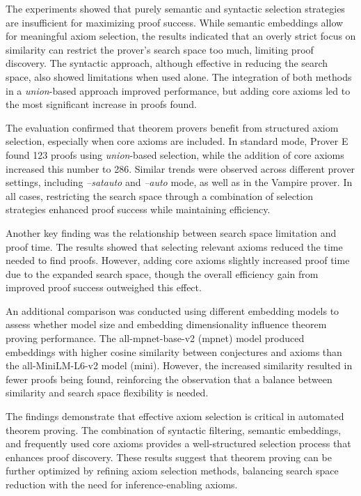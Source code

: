 \documentclass[english,version-2020-11]{uzl-thesis}
\begin{document}
The experiments showed that purely semantic and syntactic selection strategies are insufficient for maximizing proof success. While semantic embeddings allow for meaningful axiom selection, the results indicated that an overly strict focus on similarity can restrict the prover’s search space too much, limiting proof discovery. The syntactic approach, although effective in reducing the search space, also showed limitations when used alone. The integration of both methods in a \textit{union}-based approach improved performance, but adding core axioms led to the most significant increase in proofs found.

The evaluation confirmed that theorem provers benefit from structured axiom selection, especially when core axioms are included. In standard mode, Prover E found 123 proofs using \textit{union}-based selection, while the addition of core axioms increased this number to 286. Similar trends were observed across different prover settings, including \textit{--satauto} and \textit{--auto} mode, as well as in the Vampire prover. In all cases, restricting the search space through a combination of selection strategies enhanced proof success while maintaining efficiency.

Another key finding was the relationship between search space limitation and proof time. The results showed that selecting relevant axioms reduced the time needed to find proofs. However, adding core axioms slightly increased proof time due to the expanded search space, though the overall efficiency gain from improved proof success outweighed this effect.

An additional comparison was conducted using different embedding models to assess whether model size and embedding dimensionality influence theorem proving performance. The all-mpnet-base-v2 (mpnet) model produced embeddings with higher cosine similarity between conjectures and axioms than the all-MiniLM-L6-v2 model (mini). However, the increased similarity resulted in fewer proofs being found, reinforcing the observation that a balance between similarity and search space flexibility is needed. 

The findings demonstrate that effective axiom selection is critical in automated theorem proving. The combination of syntactic filtering, semantic embeddings, and frequently used core axioms provides a well-structured selection process that enhances proof discovery. These results suggest that theorem proving can be further optimized by refining axiom selection methods, balancing search space reduction with the need for inference-enabling axioms.
\end{document}
